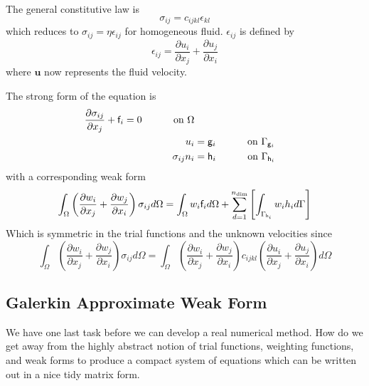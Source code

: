 \documentclass[10pt]{article}
\newcommand{\curly}{\sf }
\begin{document}
	The general constitutive law is
		\begin{equation} 
			\sigma_{ij} = c_{ijkl} \epsilon_{kl}
		\end{equation}
	which reduces to $\sigma_{ij} = \eta \epsilon_{ij}$ for homogeneous fluid.
	$\epsilon_{ij}$ is defined by
		\begin{equation}
			\epsilon_{ij} = \frac{\partial u_i}{\partial x_j} +  \frac{\partial u_j}{\partial x_i}
		\end{equation}
	where $\mathbf{u}$ now represents the fluid velocity.
	
	The strong form of the equation is
		\begin{equation}
			\begin{split}
				\frac{\partial \sigma_{ij}}{\partial x_j} + {\curly f}_i = 0  \mbox{\hspace{1cm} on $\Omega$} \\
					u_i & = {\curly g}_i \mbox{\hspace{1cm} on $\Gamma_{{\curly g}_i}$} \\
				 	\sigma_{ij} n_i &= {\curly h}_i \mbox{\hspace{1cm} on $\Gamma_{{\curly h}_i}$}
			\end{split}
		\end{equation}
	with a corresponding weak form
		\begin{equation}
			\int_\Omega \left(  \frac{\partial w_i}{\partial x_j} +  \frac{\partial w_j}{\partial x_i}  \right) \sigma_{ij} d \Omega =
				\int_\Omega w_i {\curly f}_i d\Omega + 
				\sum_{d=1}^{n_{\rm dim}} \left[ \int_{\Gamma_{{\curly h}_i}} w_i h_i d\Gamma \right]
		\end{equation}
	Which is symmetric in the trial functions and the unknown velocities since
		\begin{equation}
			\int_\Omega \left(  \frac{\partial w_i}{\partial x_j} +  \frac{\partial w_j}{\partial x_i}  \right) \sigma_{ij} d \Omega =
			\int_\Omega \left(  \frac{\partial w_i}{\partial x_j} +  \frac{\partial w_j}{\partial x_i}  \right) c_{ijkl}
				\left(  \frac{\partial u_i}{\partial x_j} +  \frac{\partial u_j}{\partial x_i} \right) d \Omega
		\end{equation}
	
	\subsection{Galerkin Approximate Weak Form}
	
	We have one last task before we can develop a real numerical method. How do 
	we get away from the highly abstract notion of trial functions, weighting functions, 
	and weak forms to produce a compact system of equations which 
	can be written out in a nice tidy matrix form.
	
\end{document}
